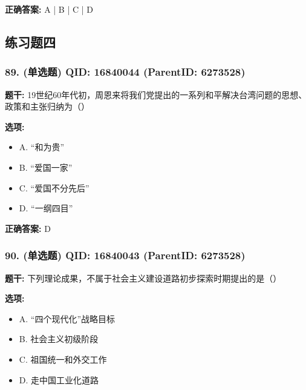 \documentclass[12pt,UTF8]{ctexart}
\begin{document}
\textbf{正确答案:}
A | B | C | D

\vspace{0.3em}\hrulefill\vspace{0.7em}

\subsection*{练习题四}

\subsubsection*{89. (单选题) \small QID: 16840044 (ParentID: 6273528)}

\textbf{题干:}
19世纪60年代初，周恩来将我们党提出的一系列和平解决台湾问题的思想、政策和主张归纳为（）



\textbf{选项:}
\begin{itemize}[leftmargin=*]

  \item A. “和为贵”

  \item B. “爱国一家”

  \item C. “爱国不分先后”

  \item D. “一纲四目”

\end{itemize}

\textbf{正确答案:}
D

\vspace{0.3em}\hrulefill\vspace{0.7em}

\subsubsection*{90. (单选题) \small QID: 16840043 (ParentID: 6273528)}

\textbf{题干:}
下列理论成果，不属于社会主义建设道路初步探索时期提出的是（）



\textbf{选项:}
\begin{itemize}[leftmargin=*]

  \item A. “四个现代化”战略目标

  \item B. 社会主义初级阶段

  \item C. 祖国统一和外交工作

  \item D. 走中国工业化道路

\end{itemize}
\end{document}
